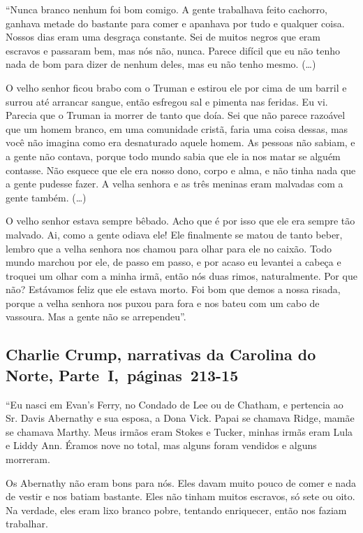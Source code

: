 ``Nunca branco nenhum foi bom comigo. A gente trabalhava feito cachorro,
ganhava metade do bastante para comer e apanhava por tudo e qualquer
coisa. Nossos dias eram uma desgraça constante. Sei de muitos negros que
eram escravos e passaram bem, mas nós não, nunca. Parece difícil que eu
não tenho nada de bom para dizer de nenhum deles, mas eu não tenho
mesmo. (\ldots{})

O velho senhor ficou brabo com o Truman e estirou ele por cima de um
barril e surrou até arrancar sangue, então esfregou sal e pimenta nas
feridas. Eu vi. Parecia que o Truman ia morrer de tanto que doía. Sei
que não parece razoável que um homem branco, em uma comunidade cristã,
faria uma coisa dessas, mas você não imagina como era desnaturado aquele
homem. As pessoas não sabiam, e a gente não contava, porque todo mundo
sabia que ele ia nos matar se alguém contasse. Não esquece que ele era
nosso dono, corpo e alma, e não tinha nada que a gente pudesse fazer. A
velha senhora e as três meninas eram malvadas com a gente também.
(\ldots{})

O velho senhor estava sempre bêbado. Acho que é por isso que ele era
sempre tão malvado. Ai, como a gente odiava ele! Ele finalmente se matou
de tanto beber, lembro que a velha senhora nos chamou para olhar para
ele no caixão. Todo mundo marchou por ele, de passo em passo, e por
acaso eu levantei a cabeça e troquei um olhar com a minha irmã, então
nós duas rimos, naturalmente. Por que não? Estávamos feliz que ele
estava morto. Foi bom que demos a nossa risada, porque a velha senhora
nos puxou para fora e nos bateu com um cabo de vassoura. Mas a gente não
se arrependeu''.

\subsection{Charlie Crump, narrativas da Carolina do Norte, Parte~I,~páginas~213-15} \label{ref63}

``Eu nasci em Evan's Ferry, no Condado de Lee ou de Chatham, e pertencia
ao Sr. Davis Abernathy e sua esposa, a Dona Vick. Papai se chamava
Ridge, mamãe se chamava Marthy. Meus irmãos eram Stokes e Tucker, minhas
irmãs eram Lula e Liddy Ann. Éramos nove no total, mas alguns foram
vendidos e alguns morreram.

Os Abernathy não eram bons para nós. Eles davam muito pouco de comer e
nada de vestir e nos batiam bastante. Eles não tinham muitos escravos,
só sete ou oito. Na verdade, eles eram lixo branco pobre, tentando
enriquecer, então nos faziam trabalhar.

